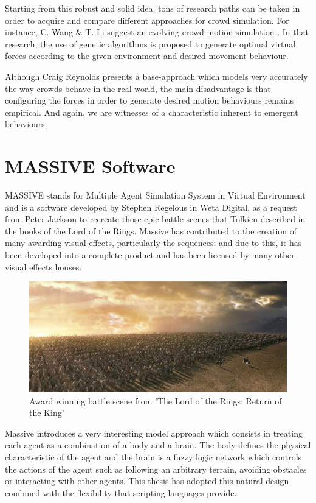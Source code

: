 Starting from this robust and solid idea, tons of research paths can be taken in order to acquire and compare different approaches for crowd simulation. For instance, C. Wang \& T. Li suggest an evolving crowd motion simulation \citep{wang}. In that research, the use of genetic algorithms is proposed to generate optimal virtual forces according to the given environment and desired movement behaviour.

Although Craig Reynolds presents a base-approach which models very accurately the way crowds behave in the real world, the main disadvantage is that configuring the forces in order to generate desired motion behaviours remains empirical. And again, we are witnesses of a characteristic inherent to emergent behaviours.

\section{MASSIVE Software}

MASSIVE stands for Multiple Agent Simulation System in Virtual Environment and is a software developed by Stephen Regelous in Weta Digital, as a request from Peter Jackson to recreate those epic battle scenes that Tolkien described in the books of the Lord of the Rings. Massive has contributed to the creation of many awarding visual effects, particularly  the sequences; and due to this, it has been developed into a complete product and has been licensed by many other visual effects houses.

\begin{figure}[!htb]
  \centering
  \includegraphics[scale=0.5]{rohan_army.eps}
  \caption{Award winning battle scene from 'The Lord of the Rings: Return of the King'}
  \label{fig:massive}
\end{figure}

Massive introduces a very interesting model approach which consists in treating each agent as a combination of a body and a brain. The body defines the physical characteristic of the agent and the brain is a fuzzy logic network which controls the actions of the agent such as following an arbitrary terrain, avoiding obstacles or interacting with other agents. This thesis has adopted this natural design combined with the flexibility that scripting languages provide.

